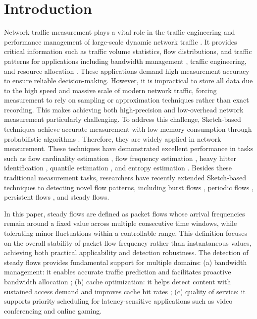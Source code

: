 \documentclass[preprint,12pt]{elsarticle}
\begin{document}

\section{Introduction}
Network traffic measurement \cite{b1,b2,b3} plays a vital role in the traffic engineering and performance management of large-scale dynamic network traffic \cite{b4,b5,b6,b7}. It provides critical information such as traffic volume statistics, flow distributions, and traffic patterns for applications including bandwidth management \cite{b8}, traffic engineering, and resource allocation \cite{b9}. These applications demand high measurement accuracy to ensure reliable decision-making. However, it is impractical to store all data due to the high speed and massive scale of modern network traffic, forcing measurement to rely on sampling or approximation techniques rather than exact recording. This makes achieving both high-precision and low-overhead network measurement particularly challenging. To address this challenge, Sketch-based techniques achieve accurate measurement with low memory consumption through probabilistic algorithms \cite{b10,b11}. Therefore, they are widely applied in network measurement. These techniques have demonstrated excellent performance in tasks such as flow cardinality estimation \cite{b12}, flow frequency estimation \cite{b13}, heavy hitter identification \cite{b14}, quantile estimation \cite{b15}, and entropy estimation \cite{b16}. Besides these traditional measurement tasks, researchers have recently extended Sketch-based techniques to detecting novel flow patterns, including burst flows \cite{b17}, periodic flows \cite{b18}, persistent flows \cite{b19}, and steady flows.


In this paper, steady flows are defined as packet flows whose arrival frequencies remain around a fixed value across multiple consecutive time windows, while tolerating minor fluctuations within a controllable range. This definition focuses on the overall stability of packet flow frequency rather than instantaneous values, achieving both practical applicability and detection robustness. The detection of steady flows provides fundamental support for multiple domains: (a) bandwidth management: it enables accurate traffic prediction and facilitates proactive bandwidth allocation \cite{b20}; (b) cache optimization: it helps detect content with sustained access demand and improves cache hit rates \cite{b21}; (c) quality of service: it supports priority scheduling for latency-sensitive applications such as video conferencing and online gaming.
\end{document}
